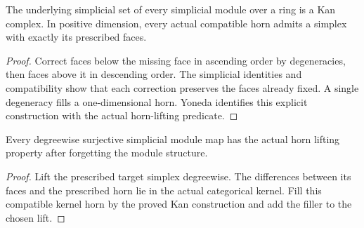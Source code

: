 \begin{proposition}
  \label{prop:simplicial-module-kan-fillers}
  \leanok
  The underlying simplicial set of every simplicial module over a ring is a Kan complex. In positive dimension, every actual compatible horn admits a simplex with exactly its prescribed faces.
\end{proposition}
\begin{proof}
  Correct faces below the missing face in ascending order by degeneracies, then faces above it in descending order. The simplicial identities and compatibility show that each correction preserves the faces already fixed. A single degeneracy fills a one-dimensional horn. Yoneda identifies this explicit construction with the actual horn-lifting predicate.
  \leanok
\end{proof}

\begin{proposition}
  \label{prop:simplicial-module-kan-fibrations}
  \leanok
  Every degreewise surjective simplicial module map has the actual horn lifting property after forgetting the module structure.
\end{proposition}
\begin{proof}
  Lift the prescribed target simplex degreewise. The differences between its faces and the prescribed horn lie in the actual categorical kernel. Fill this compatible kernel horn by the proved Kan construction and add the filler to the chosen lift.
  \leanok
\end{proof}

